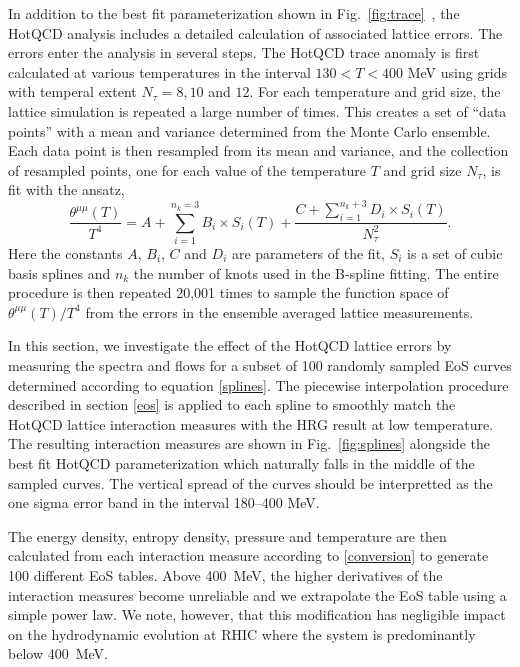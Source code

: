 \documentclass[aps,prc,reprint,amsmath,nofootinbib,superscriptaddress]{revtex4-1}
\begin{document}
In addition to the best fit parameterization shown in Fig.~\ref{fig:trace}~, the HotQCD analysis includes a detailed calculation of associated lattice errors. The errors enter the analysis in several steps.
The HotQCD trace anomaly is first calculated at various temperatures in the interval $130 < T < 400$ MeV using grids with temperal extent $N_\tau = 8,10$ and $12$.
For each temperature and grid size, the lattice simulation is repeated a large number of times. 
This creates a set of ``data points'' with a mean and variance determined from the Monte Carlo ensemble. 
Each data point is then resampled from its mean and variance, and the collection of resampled points, one for each value of the temperature $T$ and grid size $N_\tau$, is fit with the ansatz,
\begin{equation}
 \label{splines}
 \frac{\theta^{\mu\mu}(T)}{T^4} = A + \sum\limits_{i=1}^{n_k=3} B_i \times S_i(T) + \frac{C + \sum_{i=1}^{n_k + 3} D_i \times S_i(T)}{N_\tau^2}.
\end{equation}
Here the constants $A$, $B_i$, $C$ and $D_i$ are parameters of the fit, $S_i$ is a set of cubic basis splines and $n_k$ the number of knots used in the B-spline fitting. 
The entire procedure is then repeated 20,001 times to sample the function space of $\theta^{\mu\mu}(T)/T^4$ from the errors in the ensemble averaged lattice measurements.

In this section, we investigate the effect of the HotQCD lattice errors by measuring the spectra and flows for a subset of 100 randomly sampled EoS curves determined according to equation \eqref{splines}.
The piecewise interpolation procedure described in section \ref{eos} is applied to each spline to smoothly match the HotQCD lattice interaction measures with the HRG result at low temperature. 
The resulting interaction measures are shown in Fig.~\ref{fig:splines} alongside the best fit HotQCD parameterization which naturally falls in the middle of the sampled curves. 
The vertical spread of the curves should be interpretted as the one sigma error band in the interval 180--400 MeV. 

The energy density, entropy density, pressure and temperature are then calculated from each interaction measure according to \eqref{conversion} to generate 100 different EoS tables. 
Above 400~MeV, the higher derivatives of the interaction measures become unreliable and we extrapolate the EoS table using a simple power law. 
We note, however, that this modification has negligible impact on the hydrodynamic evolution at RHIC where the system is predominantly below 400~MeV.
\end{document}
